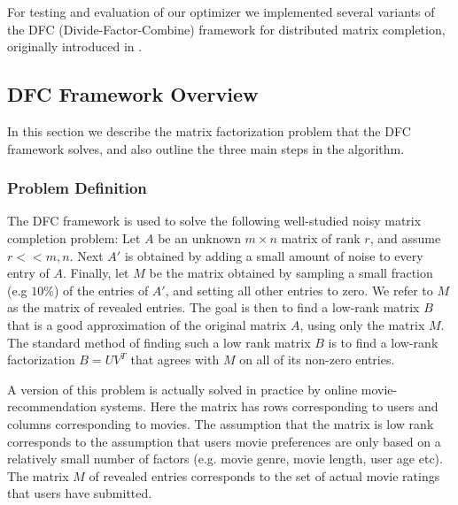 For testing and evaluation of our optimizer we implemented several variants of the DFC (Divide-Factor-Combine) framework for distributed matrix completion, originally introduced in \cite{Ameet}.

\subsection{DFC Framework Overview}
In this section we describe the matrix factorization problem that the DFC framework solves, and also outline the three main steps in the algorithm. 
\subsubsection{Problem Definition}
The DFC framework is used to solve the following well-studied noisy matrix completion problem: Let $A$ be an unknown $m\times n$ matrix of rank $r$, and assume $r<<m,n$. Next $A'$ is obtained by adding a small amount of noise to every entry of $A$. Finally, let $M$ be the matrix obtained by sampling a small fraction (e.g $10\%$) of the entries of $A'$, and setting all other entries to zero. We refer to $M$ as the matrix of revealed entries. The goal is then to find a low-rank matrix $B$ that is a good approximation of the original matrix $A$, using only the matrix $M$. The standard method of finding such a low rank matrix $B$ is to find a low-rank factorization $B=UV^T$ that agrees with $M$ on all of its non-zero entries.

A version of this problem is actually solved in practice by online movie-recommendation systems. Here the matrix has rows corresponding to users and columns corresponding to movies. The assumption that the matrix is low rank corresponds to the assumption that users movie preferences are only based on a relatively small number of factors (e.g. movie genre, movie length, user age etc). The matrix $M$ of revealed entries corresponds to the set of actual movie ratings that users have submitted.

